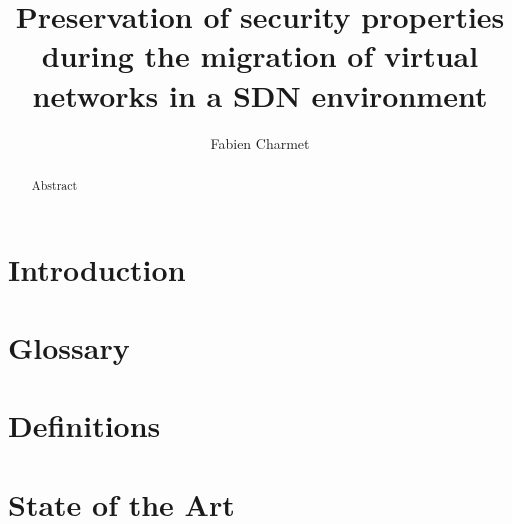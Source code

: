 \documentclass[a4paper, 11pt]{article}
\title{\LARGE \bf Preservation of security properties during the migration of virtual networks in a SDN environment}
\author{Fabien Charmet}
\newcommand{\boxedtext}[1]{\fbox{\scriptsize\bfseries\textsf{#1}}}
\newcommand{\myremark}[2]{
   \textcolor{blue}{\boxedtext{#1}
      {\small$\blacktriangleright$\emph{\textsl{#2}}$\blacktriangleleft$}
}}
\newcommand\FC[1]{\myremark{FC}{#1}}
\begin{document}

\maketitle

\begin{abstract}
Abstract
\end{abstract}

\tableofcontents
\listoffigures
 \listoftables
\thispagestyle{empty}


\newpage
{}
\section{Introduction}

 
\section{Glossary}



\newpage
\section{Definitions}
\label{sec:basic_def}


\newpage
\section{State of the Art}
\label{sec:sota}

\end{document}
